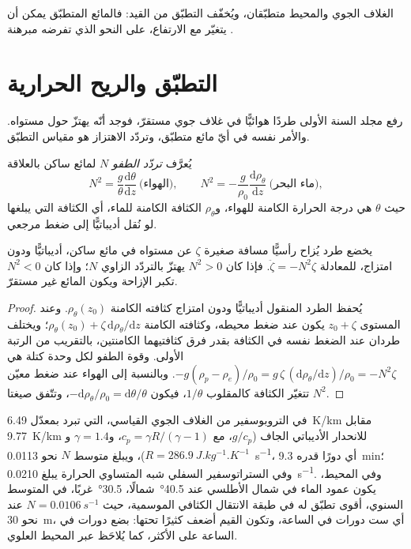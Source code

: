 الغلاف الجوي والمحيط متطبّقان، ويُخفّف التطبّق من القيد:
فالمائع المتطبّق يمكن أن يتغيّر مع الارتفاع، على النحو الذي
تفرضه مبرهنة .

\section{التطبّق والريح الحرارية}\label{sec:b3:gfd-foundations:stratification}

رفع مجلد السنة الأولى طردًا هوائيًّا في غلاف جوي مستقرّ، فوجد
أنّه يهتزّ حول مستواه. والأمر نفسه في أيّ مائع متطبّق،
وتردّد الاهتزاز هو مقياس التطبّق.

\begin{definition}\label{def:b3:gfd-foundations:buoyancy}
يُعرَّف \emph{تردّد الطفو} $N$ لمائع
ساكن بالعلاقة
\[
N^2 = \frac{g}{\theta}\frac{\mathrm d\theta}{\mathrm dz}\ \text{(الهواء)},
\qquad
N^2 = -\frac{g}{\rho_0}\frac{\mathrm d\rho_\theta}{\mathrm dz}\ \text{(ماء البحر)},
\]
حيث $\theta$ هي درجة الحرارة الكامنة للهواء، و$\rho_\theta$ الكثافة
الكامنة للماء، أي الكثافة التي يبلغها لو نُقل أديباتيًّا
إلى ضغط مرجعي.
\end{definition}

\begin{theorem}\label{thm:b3:gfd-foundations:buoyancy}
يخضع طرد يُزاح رأسيًّا مسافة صغيرة $\zeta$ عن مستواه في
مائع ساكن، أديباتيًّا ودون امتزاج، للمعادلة $\ddot\zeta =
-N^2\zeta$. فإذا كان $N^2 > 0$ يهتزّ بالتردّد الزاوي $N$؛ وإذا
كان $N^2 < 0$ تكبر الإزاحة ويكون المائع غير مستقرّ.
\end{theorem}

\begin{proof}
يُحفظ الطرد المنقول أديباتيًّا ودون امتزاج كثافته الكامنة
$\rho_\theta(z_0)$. وعند المستوى $z_0 + \zeta$ يكون عند ضغط محيطه،
وكثافته الكامنة $\rho_\theta(z_0) +
\zeta\,\mathrm d\rho_\theta/\mathrm dz$؛ ويختلف طردان عند الضغط نفسه
في الكثافة بقدر فرق كثافتيهما الكامنتين، بالتقريب من
الرتبة الأولى. وقوة الطفو لكل وحدة كتلة هي $-g(\rho_p - \rho_e)/\rho_0 =
g\,\zeta\,(\mathrm d\rho_\theta/\mathrm dz)/\rho_0 = -N^2\zeta$. وبالنسبة إلى الهواء عند
ضغط معيّن تتغيّر الكثافة كالمقلوب $1/\theta$، فيكون $-\mathrm
d\rho_\theta/\rho_0 = \mathrm d\theta/\theta$، وتتّفق
صيغتا $N^2$.
\end{proof}

في التروبوسفير من الغلاف الجوي القياسي، التي تبرد بمعدّل
\qty{6.49}{K/km} مقابل \qty{9.77}{K/km} للانحدار الأديباتي الجاف ($g/c_p$،
مع $c_p = \gamma R/(\gamma - 1)$، و$\gamma = 1.4$ و$R =
\qty{286.9}{J.kg^{-1}.K^{-1}}$)، ويبلغ متوسط $N$ نحو \qty{0.0113}{s^{-1}}، أي دورًا
قدره \qty{9.3}{min}؛ وفي الستراتوسفير السفلي شبه المتساوي الحرارة يبلغ
\qty{0.0210}{s^{-1}}. وفي المحيط، يكون عمود الماء في شمال الأطلسي
عند \ang{40.5}~شمالًا، \ang{30.5}~غربًا، في المتوسط السنوي، أقوى تطبّق له
في طبقة الانتقال الكثافي الموسمية، حيث $N = \qty{0.0106}{s^{-1}}$ عند
نحو \qty{30}{m}، أي ست دورات في الساعة، وتكون القيم أضعف كثيرًا تحتها: بضع
دورات في الساعة على الأكثر، كما يُلاحَظ عبر المحيط العلوي.

